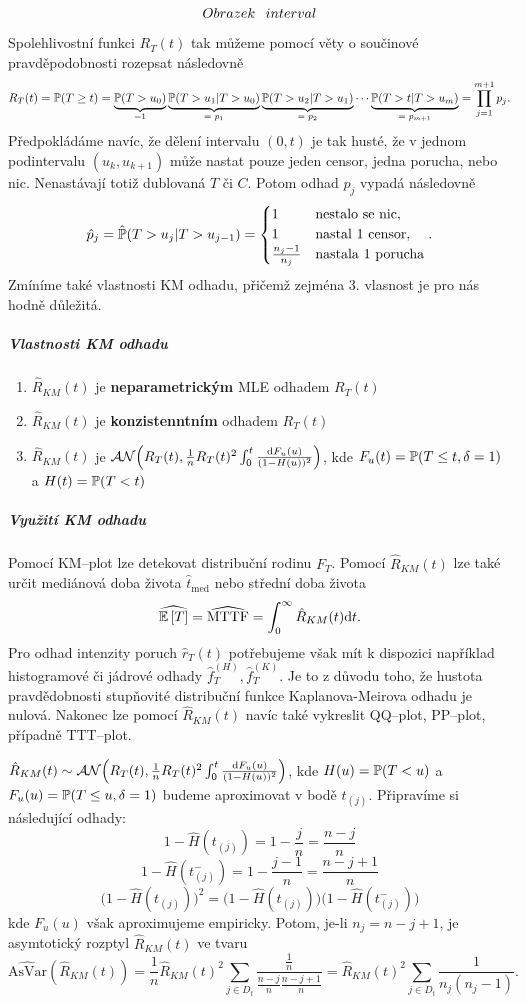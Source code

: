 $$\Huge{Obrazek~interval}$$

Spolehlivostní funkci $R_T(t)$ tak můžeme pomocí věty o součinové pravděpodobnosti rozepsat následovně
$$ R_T(t) = \mathbb{P}(T \geq t) = \underbrace{\mathbb{P}(T > u_0)}_{\text{=1}} \underbrace{\mathbb{P}(T > u_1|T>u_0)}_{\text{= $p_{1}$}}\underbrace{\mathbb{P}(T > u_2|T>u_1)}_{\text{= $p_{2}$}}\cdots\underbrace{\mathbb{P}(T > t|T>u_m)}_{\text{= $p_{m+1}$}} = \prod_{j=1}^{m+1} p_j.$$
Předpokládáme navíc, že dělení intervalu $(0,t)$ je tak husté, že v jednom podintervalu $(u_k , u_{k+1})$ může nastat pouze jeden censor, jedna porucha, nebo nic. Nenastávají totiž dublovaná $T$ či $C$. Potom odhad $p_j$ vypadá následovně
$$\hat{p}_j = \hat{\mathbb{P}}(T>u_j|T > u_{j-1}) = \begin{cases}
	1 & \mathrm{nestalo~se~nic}, \\1 & \mathrm{nastal~1~censor}, \\ \frac{n_j -1}{n_j}&  \mathrm{nastala~1~porucha} \end{cases}. $$
Zmíníme také vlastnosti KM odhadu, přičemž zejména 3. vlasnost je pro nás hodně důležitá.
\subparagraph{Vlastnosti KM odhadu}
\begin{enumerate}
	\item $\hat{R}_{KM}(t)$ je \textbf{neparametrickým} MLE odhadem $R_T(t)$
	\item $\hat{R}_{KM}(t)$ je \textbf{konzistenntním} odhadem $R_T(t)$
	\item $\hat{R}_{KM}(t)$ je $\mathcal{AN}\Big(R_T(t), \frac{1}{n}R_T(t)^2 \int_0^t \frac{\mathrm{d} F_u(u)}{(1-H(u))^2} \Big)$, kde $F_u(t) = \mathbb{P}(T\leq t,\delta=1)$ a $H(t) = \mathbb{P}(T < t)$
\end{enumerate}
\subparagraph{Využití KM odhadu}
Pomocí KM--plot lze detekovat distribuční rodinu $F_T$. Pomocí $\hat{R}_{KM}(t)$ lze také určit mediánová doba života $\hat{t}_{\mathrm{med}}$ nebo střední doba života $$\widehat{\mathbb{E}\left[ T \right]} =\widehat{\mathrm{MTTF}} = \int_0^{\infty} \hat{R}_{KM}(t) \mathrm{d} t .$$ Pro odhad intenzity poruch $\hat{r}_T(t)$ potřebujeme však mít k dispozici například histogramové či jádrové odhady $\hat{f}_T^{(H)} ,\hat{f}_T^{(K)}$. Je to z důvodu toho, že hustota pravdědobnosti stupňovité distribuční funkce Kaplanova-Meirova odhadu je nulová. Nakonec lze pomocí $\hat{R}_{KM}(t)$ navíc také vykreslit QQ--plot, PP--plot, případně TTT--plot.
\begin{theorem}
	$\hat{R}_{KM}(t) \sim \mathcal{AN}\Big(R_T(t), \frac{1}{n}R_T(t)^2 \int_0^t \frac{\mathrm{d} F_u(u)}{(1-H(u))^2} \Big)$, kde $H(u) = \mathbb{P}(T < u)$ a $F_u(u) = \mathbb{P}(T\leq u,\delta=1)$  budeme aproximovat v bodě $t_{(j)}$. Připravíme si následující odhady:
	$$ 1 - \hat{H}(t_{(j)}) = 1 -\frac{j}{n} = \frac{n-j}{n}$$
	$$ 1 - \hat{H}(t_{(j)}^{-}) = 1 -\frac{j-1}{n} = \frac{n-j+1}{n}$$
	$$ \Big(1 - \hat{H}(t_{(j)})\Big)^2 = \Big(1 - \hat{H}(t_{(j)})\Big)(1 - \hat{H}(t_{(j)}^{-})\Big)$$
	kde $F_u(u)$ však aproximujeme empiricky. Potom, je-li $n_j = n - j +1$, je asymtotický rozptyl $\hat{R}_{KM}(t)$ ve tvaru
	$$ \widehat{\mathrm{AsVar}}(\hat{R}_{KM}(t)) = \frac{1}{n}\hat{R}_{KM}(t)^2 \sum_{j\in D_t} \frac{\frac{1}{n}}{\frac{n-j}{n}\frac{n-j+1}{n}} = \hat{R}_{KM}(t)^2 \sum_{j \in D_t} \frac{1}{n_j(n_j -1)}.$$
\end{theorem}
